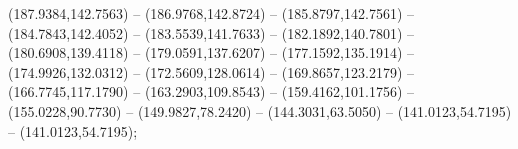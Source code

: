 \begin{scope}[y=0.80pt, x=0.80pt, yscale=-1.000000, xscale=1.000000, inner sep=0pt, outer sep=0pt]
        (187.9384,142.7563) -- (186.9768,142.8724) -- (185.8797,142.7561) --
        (184.7843,142.4052) -- (183.5539,141.7633) -- (182.1892,140.7801) --
        (180.6908,139.4118) -- (179.0591,137.6207) -- (177.1592,135.1914) --
        (174.9926,132.0312) -- (172.5609,128.0614) -- (169.8657,123.2179) --
        (166.7745,117.1790) -- (163.2903,109.8543) -- (159.4162,101.1756) --
        (155.0228,90.7730) -- (149.9827,78.2420) -- (144.3031,63.5050) --
        (141.0123,54.7195) -- (141.0123,54.7195);

\end{scope}
